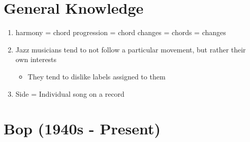 \documentclass[]{article}
\date{}
\providecommand{\tightlist}{%
  \setlength{\itemsep}{0pt}\setlength{\parskip}{0pt}}
\begin{document}
\section{General Knowledge}\label{general-knowledge}

\begin{enumerate}
\def\labelenumi{\arabic{enumi}.}
\tightlist
\item
  harmony = chord progression = chord changes = chords = changes
\item
  Jazz musicians tend to not follow a particular movement, but rather
  their own interests

  \begin{itemize}
  \tightlist
  \item
    They tend to dislike labels assigned to them
  \end{itemize}
\item
  Side = Individual song on a record
\end{enumerate}

\section{Bop (1940s - Present)}\label{bop-1940s---present}
\end{document}
